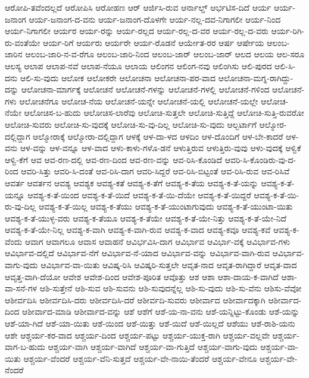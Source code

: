 {ಆರೋಪಿ-ತವೆಂದಲ್ಲದೆ
ಆರೋಪಿಸಿ
ಆರೋಹಣ
ಆರ್
ಆರ್ಜಿಸಿ-ರುವ
ಆರ್ನಾಲ್ಡ್
ಆರ್ಭಟಿಸ-ದಿದೆ
ಆರ್ಯ
ಆರ್ಯ-ಜನಾಂಗ
ಆರ್ಯ-ಜನಾಂಗ-ದ-ವನು
ಆರ್ಯ-ಜನಾಂಗ-ದೊಳಗೇ
ಆರ್ಯ-ನಲ್ಲ-ದವ-ನಿಗಾಗಲೀ
ಆರ್ಯ-ನಿಂದ
ಆರ್ಯ-ನಿಗಾಗಲೀ
ಆರ್ಯರ
ಆರ್ಯ-ರನ್ನು
ಆರ್ಯ-ರಲ್ಲದ
ಆರ್ಯ-ರಲ್ಲ-ದ-ವರ
ಆರ್ಯ-ರಲ್ಲ-ದ-ವರು
ಆರ್ಯ-ರಿಗಿ-ರು-ವಂತೆಯೇ
ಆರ್ಯ-ರಿಗೆ
ಆರ್ಯರು
ಆರ್ಯರೇ
ಆರ್ಯ-ರೊಡನೆ
ಆರ್ಯೇತ-ರರ
ಆರ್ಷ
ಆರ್ಷೇಯ
ಆಲಂಬ-ಜಾರಿನ
ಆಲಂಬ-ಜಾರಿ-ನ-ವ-ರೆಗೂ
ಆಲಂಬ-ಜಾರಿ-ನಿಂದ
ಆಲಂಬ-ಜಾರ್
ಆಲಂಬ-ಜಾರ್
ಆಲದ
ಆಲಯ
ಆಲ-ಸರೂ
ಆಲಸ್ಯ
ಆಲಾಪ
ಆಲಾಪ-ನವೆ
ಆಲಾಪ-ನೆಯೂ
ಆಲಾಯ
ಆಲಿಂಗನ
ಆಲಿಂಗ-ನವು
ಆಲಿಂಗಿಸು
ಆಲಿ-ಪುರದ
ಆಲಿ-ಸಿ-ದನು
ಆಲಿ-ಸು-ವುದು
ಆಲೋಕ
ಆಲೋಕರೇ
ಆಲೋಚನಾ
ಆಲೋಚನಾ-ಪರ-ವಾದ
ಆಲೋಚನಾ-ಮಗ್ನ-ರಾಗಿದ್ದು-ದನ್ನು
ಆಲೋಚನಾ-ಮಾರ್ಗಕ್ಕೆ
ಆಲೋಚನೆ
ಆಲೋಚನೆ-ಗಳನ್ನು
ಆಲೋಚನೆ-ಗಳಲ್ಲಿ
ಆಲೋಚನೆ-ಗಳಿಂದ
ಆಲೋಚನೆ-ಗಳು
ಆಲೋಚನೆಗೂ
ಆಲೋಚ-ನೆಯ
ಆಲೋಚನೆ-ಯನ್ನೇ
ಆಲೋಚನೆ-ಯಲ್ಲಿ
ಆಲೋಚನೆ-ಯಲ್ಲೇ
ಆಲೋಚ-ನೆಯೇ
ಆಲೋಚಿಸ-ಬ-ಹುದು
ಆಲೋಚಿಸ-ಲಾರೆವು
ಆಲೋಚಿ-ಸುತ್ತಲೇ
ಆಲೋಚಿ-ಸುತ್ತಿದ್ದೆ
ಆಲೋಚಿ-ಸುತ್ತಿ-ರುವರೋ
ಆಲೋಚಿ-ಸುವರು
ಆಲೋಚಿ-ಸು-ವುದಕ್ಕೆ
ಆಲೋಚಿ-ಸು-ವು-ದಿಲ್ಲ
ಆಲೋಚಿ-ಸು-ವುದು
ಆಲ್ಬರ್ಟಾಗೆ
ಆಲ್ಮೋರ-ದಲ್ಲಿದ್ದಾಗ
ಆಲ್ಮೋರಾಕ್ಕೆ
ಆಲ್ಮೋರಾ-ದಲ್ಲಿದ್ದಾಗ
ಆಳಕ್ಕೆ
ಆಳ-ದಾ-ಳದ
ಆಳದಿಂ
ಆಳ-ದೊಂದಿಗೆ
ಆಳ-ಬೇ-ಕಾದರೆ
ಆಳ-ವನು
ಆಳ-ವನ್ನು
ಆಳ-ವನ್ನೂ
ಆಳ-ವಾದ
ಆಳು-ಕಾಳು-ಗಳೊ-ಡನೆ
ಆಳುತ್ತಿರುವ
ಆಳುತ್ತಿರು-ವುವು
ಆಳು-ವುದಕ್ಕೆ
ಆಳ್ವಿಕೆ
ಆಳ್ವಿ-ಕೆಗೆ
ಆವ
ಆವ-ರಣ-ದಲ್ಲಿ
ಆವ-ರಣ-ದಿಂದ
ಆವ-ರಣ-ವನ್ನು
ಆವ-ರಿಸಿ-ಕೊಂಡಿದೆ
ಆವರಿ-ಸಿ-ಕೊಂಡಿರು-ವು-ದ-ರಿಂದ
ಆವರಿ-ಸಿತ್ತು
ಆವರಿ-ಸಿ-ದಂತೆ
ಆವ-ರಿಸಿ-ದಾಗ
ಆವರಿ-ಸಿದ್ದರೆ
ಆವ-ರಿಸಿ-ಬಿಟ್ಟಂತೆ
ಆವ-ರಿಸಿ-ರುವ
ಆವ-ರಿಸಿವೆ
ಆವರ್ತ
ಆವರ್ತನ
ಆವಶ್ಯ
ಆವಶ್ಯಕ
ಆವಶ್ಯ-ಕತೆ
ಆವಶ್ಯ-ಕ-ತೆಗೆ
ಆವಶ್ಯ-ಕ-ತೆಯ
ಆವಶ್ಯ-ಕ-ತೆ-ಯನ್ನು
ಆವಶ್ಯ-ಕ-ತೆ-ಯನ್ನೂ
ಆವಶ್ಯ-ಕ-ತೆ-ಯಿಂದ
ಆವಶ್ಯ-ಕ-ತೆ-ಯಿದೆ
ಆವಶ್ಯ-ಕ-ತೆ-ಯಿ-ದೆಯೇ
ಆವಶ್ಯ-ಕ-ತೆ-ಯಿದ್ದರೆ
ಆವಶ್ಯ-ಕ-ತೆ-ಯಿ-ರು-ವು-ದಿಲ್ಲ
ಆವಶ್ಯ-ಕ-ತೆ-ಯಿಲ್ಲ
ಆವಶ್ಯ-ಕ-ತೆಯು
ಆವಶ್ಯ-ಕ-ತೆ-ಯುಂಟಾಗುವುದು
ಆವಶ್ಯ-ಕ-ತೆ-ಯುಂಟಾ-ಯಿತು
ಆವಶ್ಯ-ಕ-ತೆ-ಯುಳ್ಳ-ವರು
ಆವಶ್ಯ-ಕ-ತೆಯೂ
ಆವಶ್ಯ-ಕ-ತೆಯೇ
ಆವಶ್ಯ-ಕ-ತೆ-ಯೇ-ನಿತ್ತು
ಆವಶ್ಯ-ಕ-ತೆ-ಯೇ-ನಿದೆ
ಆವಶ್ಯ-ಕ-ತೆ-ಯೇ-ನಿಲ್ಲ
ಆವಶ್ಯ-ಕ-ವಾಗಿ
ಆವಶ್ಯ-ಕ-ವಾಗಿ-ರುವ
ಆವಶ್ಯ-ಕ-ವಾದ
ಆವಶ್ಯ-ಕವೂ
ಆವಶ್ಯ-ಕವೆ
ಆವಶ್ಯ-ಕ-ವೆಂದು
ಆವಾಗ
ಆವಾಗಲೂ
ಆವಾಸ
ಆವಾಹನೆ
ಆವಿರ್ಭವಿಸಿ-ದಾಗ
ಆವಿರ್ಭಾವ
ಆವಿರ್ಭಾ-ವಕ್ಕೆ
ಆವಿರ್ಭಾವ-ಗಳು
ಆವಿರ್ಭಾವ-ದಲ್ಲಿದೆ
ಆವಿರ್ಭಾವ-ನೆಗೆ
ಆವಿರ್ಭಾವ-ನೆ-ಯಾದ
ಆವಿರ್ಭಾವ-ವನ್ನು
ಆವಿರ್ಭಾವ-ವಾಗಿ-ರುವ
ಆವಿರ್ಭಾವ-ವಾಗು-ವುದು
ಆವಿರ್ಭಾವ-ವಾ-ಯಿತು
ಆವಿಷ್ಕ-ರಿಸಿ
ಆವಿಷ್ಕರಿ-ಸುತ್ತಲೇ
ಆವೃತ-ನಾದ
ಆವೃತ-ರಾಗಿದ್ದಾರೆ
ಆವೃತ-ವಾದ
ಆವೃತ್ತ-ವಾಗಿ-ದೆಯೋ
ಆವೇಶ
ಆವೇಶ-ದಿಂದ
ಆವೇಶ-ಪೂರಿತ
ಆವೊತ್ತು
ಆಶ
ಆಶಾ
ಆಶಾ-ದಾಯ-ಕ-ವಾಗಿದೆ
ಆಶಾ-ವಾ-ಸನೆ-ಗಳ
ಆಶಿ-ಸುತ್ತೇನೆ
ಆಶಿ-ಸುವ
ಆಶಿ-ಸುವನು
ಆಶಿ-ಸುವುದನ್ನೆಲ್ಲ
ಆಶಿ-ಸು-ವುದು
ಆಶಿ-ಸು-ವೆನು
ಆಶಿಸು-ವೆವೋ
ಆಶೀರ್ವದಿಸಿ
ಆಶೀರ್ವದಿಸಿ-ದರು
ಆಶೀರ್ವದಿಸಿ-ದರೆ
ಆಶೀರ್ವದಿ-ಸುವರು
ಆಶೀರ್ವಾದ
ಆಶೀರ್ವಾದಕ್ಕಾಗಿ
ಆಶೀರ್ವಾದ-ದಿಂದ
ಆಶೀರ್ವಾದ-ಮಾಡಿ
ಆಶೀರ್ವಾದ-ವನ್ನು
ಆಶೆ
ಆಶೆಗೆ
ಆಶೆ-ಯ-ನಾ-ವನು
ಆಶೆ-ಯನ್ನಿಟ್ಟು-ಕೊಂಡು
ಆಶೆ-ಯನ್ನು
ಆಶೆ-ಯಾ-ಗಿದೆ
ಆಶೆ-ಯಾ-ಯಿತು
ಆಶೆ-ಯಿಂದ
ಆಶೆ-ಯಿತ್ತು
ಆಶೆ-ಯಿದೆ
ಆಶೆ-ಯಿಲ್ಲದೆ
ಆಶೆಯು
ಆಶೆ-ರಾಶಿ-ಯನು
ಆಶೇ
ಆಶ್ಚರ್ಯ-ಕರ-ವಾದ
ಆಶ್ಚರ್ಯ-ದಿಂದ
ಆಶ್ಚರ್ಯ-ಪಟ್ಟು
ಆಶ್ಚರ್ಯ-ಯುಕ್ತ-ರಾಗಿ
ಆಶ್ಚರ್ಯ-ವಲ್ಲವೇ
ಆಶ್ಚರ್ಯ-ವಾಗ-ಬ-ಹುದು
ಆಶ್ಚರ್ಯ-ವಾಗಿ
ಆಶ್ಚರ್ಯ-ವಾಗಿದೆ
ಆಶ್ಚರ್ಯ-ವಾ-ಗುತ್ತಿದೆ
ಆಶ್ಚರ್ಯ-ವಾಗು-ವುದು
ಆಶ್ಚರ್ಯ-ವಾ-ಯಿತು
ಆಶ್ಚರ್ಯ-ವೆಂದರೆ
ಆಶ್ಚರ್ಯ-ವೆನಿ-ಸುತ್ತದೆ
ಆಶ್ಚರ್ಯ-ವೇ-ನಾಯಿ-ತೆಂದರೆ
ಆಶ್ಚರ್ಯ-ವೇನೂ
ಆಶ್ಚರ್ಯ-ವೇ-ನೆಂದರೆ
}
